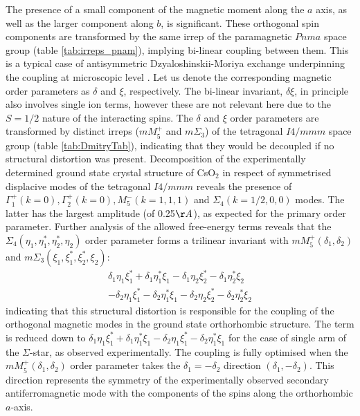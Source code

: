 \documentclass[prb,aps,twocolumn,superscriptaddress,showpacs,footinbib]{revtex4-2}
\begin{document}
The presence of a small component of the magnetic moment along the $a$ axis, as well as the larger component along $b$, is significant. These orthogonal spin components are transformed by the same irrep of the paramagnetic $Pnma$ space group (table \ref{tab:irreps_pnam}), implying bi-linear coupling between them. This is a typical case of antisymmetric Dzyaloshinskii-Moriya exchange underpinning the coupling at microscopic level \cite{DZYALOSHINSKY}. Let us denote the corresponding magnetic order parameters as $\delta$ and $\xi$, respectively. The bi-linear invariant, $\delta \xi$, in principle also involves single ion terms, however these are not relevant here due to the $S=1/2$ nature of the interacting spins. The $\delta$ and $\xi$ order parameters are transformed by distinct irreps ($mM_5^+$ and $m\Sigma_3$) of the tetragonal $I4/mmm$ space group (table \ref{tab:DmitryTab}), indicating that they would be decoupled if no structural distortion was present. Decomposition of the experimentally determined ground state crystal structure of CsO$_2$ in respect of symmetrised displacive modes of the tetragonal $I4/mmm$ reveals the presence of $\Gamma^+_1 (k=0), \Gamma^+_2 (k=0), M_5^-(k=1,1,1)$ and $\Sigma_4 (k=1/2,0,0)$ modes. The latter has the largest amplitude (of 0.25$\AA$), as expected for the primary order parameter. Further analysis of the allowed free-energy terms reveals that the $\Sigma_4(\eta_1,\eta_1^*,\eta_2^*,\eta_2)$ order parameter forms a trilinear invariant with $mM_5^+(\delta_1,\delta_2)$ and $m\Sigma_3(\xi_1,\xi_1^*,\xi_2^*,\xi_2)$:
\begin{equation}
\begin{split}
\delta_1\eta_1\xi_1^*+\delta_1\eta_1^*\xi_1-\delta_1\eta_2\xi_2^*-\delta_1\eta_2^*\xi_2\\
-\delta_2\eta_1\xi_1^*-\delta_2\eta_1^*\xi_1-\delta_2\eta_2\xi_2^*-\delta_2\eta_2^*\xi_2 \nonumber
\end{split}
\end{equation}
indicating that this structural distortion is responsible for the coupling of the orthogonal magnetic modes in the ground state orthorhombic structure. The term is reduced down to $\delta_1\eta_1\xi_1^*+\delta_1\eta_1^*\xi_1-\delta_2\eta_1\xi_1^*-\delta_2\eta_1^*\xi_1$ for the case of single arm of the $\Sigma$-star, as observed experimentally. The coupling is fully optimised when the $mM_5^+(\delta_1,\delta_2)$ order parameter takes the $\delta_1=-\delta_2$ direction $(\delta_1,-\delta_2)$. This direction represents the symmetry of the experimentally observed secondary antiferromagnetic mode with the components of the spins along the orthorhombic $a$-axis.
\end{document}
